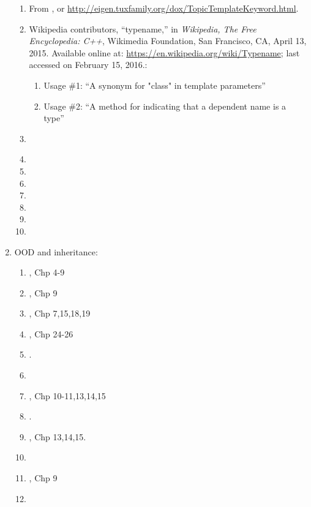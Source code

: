 \begin{enumerate}
\begin{enumerate}
	\item From \cite[API documentation for Eigen3: The template and typename keywords in C++]{Avery2016}, or \url{http://eigen.tuxfamily.org/dox/TopicTemplateKeyword.html}.
	\item Wikipedia contributors, ``typename,'' in {\it Wikipedia, The Free Encyclopedia: C++}, Wikimedia Foundation, San Francisco, CA, April 13, 2015. Available online at: \url{https://en.wikipedia.org/wiki/Typename}; last accessed on February 15, 2016.: \vspace{-0.2cm}
		\begin{enumerate} \itemsep -2pt
		\item Usage \#1: ``A synonym for "class" in template parameters''
		\item Usage \#2: ``A method for indicating that a dependent name is a type''
		\end{enumerate}
	\item \cite[pp. 916]{Savitch2009}
	\item 
	\item 
	\item 
	\item 
	\item 
	\item 
	\item 
	\end{enumerate}
\item OOD and inheritance: \vspace{-0.3cm}
	\begin{enumerate} \itemsep -2pt
	\item \cite{Gregoire2014}, Chp 4-9
	\item \cite{Stroustrup2014}, Chp 9
	\item \cite{Lippman2013}, Chp 7,15,18,19
	\item \cite{Allain2012}, Chp 24-26
	\item \cite[Chp. 13--15; Appendices E and J]{Gaddis2012}.
	\item \cite[Chp. 9--10, 389--479]{Horstmann2012}
	\item \cite{Prata2012}, Chp 10-11,13,14,15
	\item \cite[Chp. 7, 11, 15; Appendices A, D, J, and K]{Gaddis2011}.
	\item \cite{Gaddis2010}, Chp 13,14,15.
	\item \cite[Chp. 10; \S12.1, 696--711; Chp. 15; Chp. 17]{Savitch2009}
	\item \cite{Stroustrup2009}, Chp 9
	\item \cite[Chp. 10--14, pp. 445--786]{Prata2005}

\end{enumerate}
\end{enumerate}
